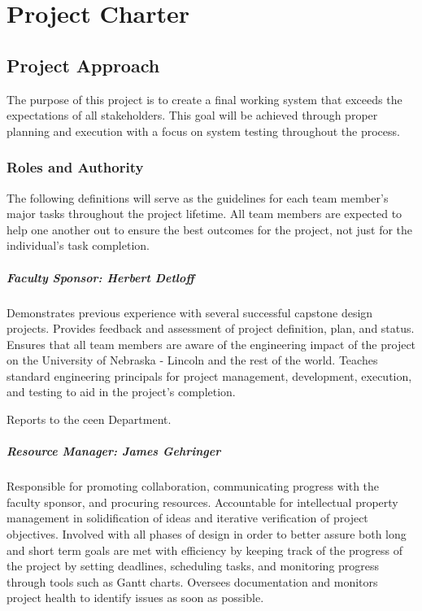 \chapter{Project Charter}
\section{Project Approach}
The purpose of this project is to create a final working system that exceeds the expectations of all stakeholders.
This goal will be achieved through proper planning and execution with a focus on system testing throughout the process.

\subsection{Roles and Authority}
The following definitions will serve as the guidelines for each team member's major tasks throughout the project lifetime. 
All team members are expected to help one another out to ensure the best outcomes for the project, not just for the individual's task completion.
\paragraph{Faculty Sponsor: Herbert Detloff}
Demonstrates previous experience with several successful capstone design projects.
Provides feedback and assessment of project definition, plan, and status.
Ensures that all team members are aware of the engineering impact of the project on the University of Nebraska - Lincoln and the rest of the world.
Teaches standard engineering principals for project management, development, execution, and testing to aid in the project's completion.

Reports to the \gls{ceen} Department.

\paragraph{Resource Manager: James Gehringer}
Responsible for promoting collaboration, communicating progress with the faculty sponsor, and procuring resources.
Accountable for intellectual property management in solidification of ideas and iterative verification of project objectives.
Involved with all phases of design in order to better assure both long and short term goals are met with efficiency by keeping track of the progress of the project by setting deadlines, scheduling tasks, and monitoring progress through tools such as Gantt charts.
Oversees documentation and monitors project health to identify issues as soon as possible.

